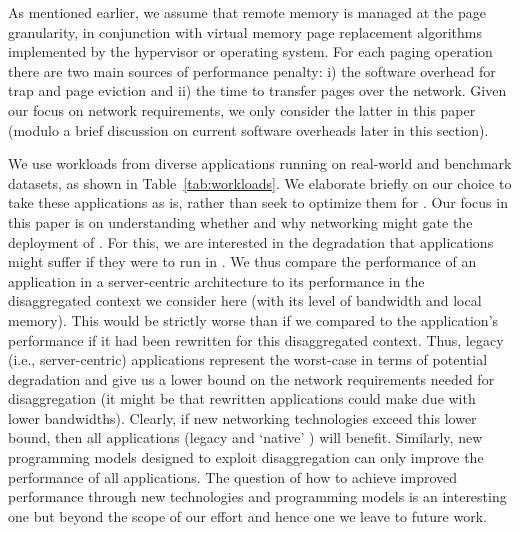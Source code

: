 As mentioned earlier, we assume that remote memory is managed at the page granularity, in conjunction with virtual memory page replacement algorithms implemented by the hypervisor or operating system.
For each paging operation there are two main sources 
of performance penalty: i) the software overhead for trap and page eviction and ii) the time to transfer pages over the network. 
Given our focus on network requirements, we only consider the latter in this paper (modulo a brief discussion on current 
software overheads later in this section).

We use workloads from diverse applications running on real-world and benchmark datasets, as shown in Table~\ref{tab:workloads}. 
We elaborate briefly on our choice to take these applications as is, rather than seek to optimize them for \dis. Our focus in this paper is on understanding whether and why networking might gate the deployment of \dis.  
For this, we are interested in the degradation that applications might suffer if they were to run in \dis. We thus compare the performance of an application in a server-centric architecture to its performance in the disaggregated context we consider here (with its level of bandwidth and local memory). 
This would be strictly worse than if we compared to the application's performance if it had been rewritten for this disaggregated context. Thus, legacy (i.e., server-centric) applications represent the worst-case in terms of potential degradation and give us a lower bound on the network requirements needed for disaggregation (it might be that rewritten applications could make due with lower bandwidths). 
Clearly, if new networking technologies exceed this lower bound, then all applications (legacy and `native' \dis) will benefit. Similarly, new programming models designed to exploit disaggregation can only improve the performance of all applications. 
The question of how to achieve improved performance through new technologies and programming models is an interesting one but beyond the scope of our effort and hence one we leave to future work. 


